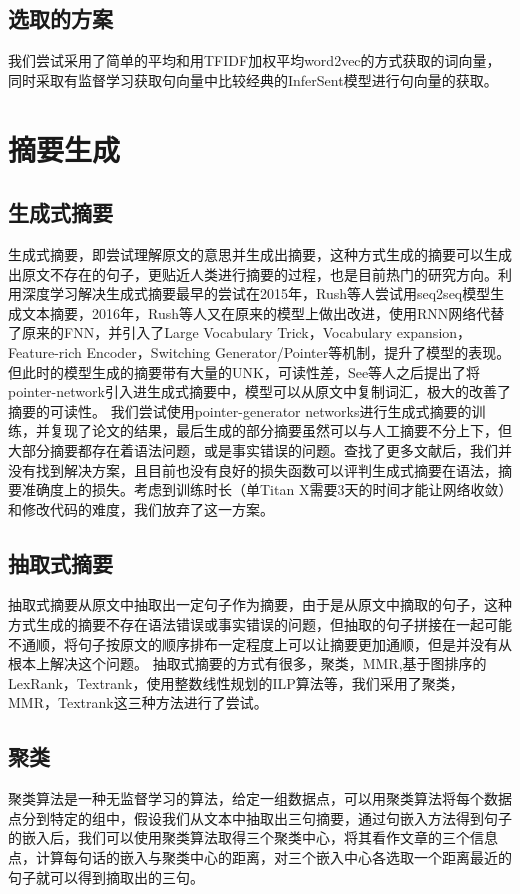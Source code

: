 \documentclass[10pt,twocolumn,letterpaper]{article}
\begin{document}
	\subsection{选取的方案}
	我们尝试采用了简单的平均和用TFIDF加权平均word2vec的方式获取的词向量，同时采取有监督学习获取句向量中比较经典的InferSent模型进行句向量的获取。


	\section{摘要生成}

	\subsection{生成式摘要}
	生成式摘要，即尝试理解原文的意思并生成出摘要，这种方式生成的摘要可以生成出原文不存在的句子，更贴近人类进行摘要的过程，也是目前热门的研究方向。利用深度学习解决生成式摘要最早的尝试在2015年，Rush等人\cite{rush2015neural}尝试用seq2seq模型生成文本摘要，2016年，Rush等人\cite{nallapati2016abstractive}又在原来的模型上做出改进，使用RNN网络代替了原来的FNN，并引入了Large Vocabulary Trick，Vocabulary expansion，Feature-rich Encoder，Switching Generator/Pointer等机制，提升了模型的表现。但此时的模型生成的摘要带有大量的UNK，可读性差，See等人\cite{see2017get}之后提出了将pointer-network\cite{vinyals2015pointer}引入进生成式摘要中，模型可以从原文中复制词汇，极大的改善了摘要的可读性。
	我们尝试使用pointer-generator networks\cite{see2017get}进行生成式摘要的训练，并复现了论文的结果，最后生成的部分摘要虽然可以与人工摘要不分上下，但大部分摘要都存在着语法问题，或是事实错误的问题。查找了更多文献后，我们并没有找到解决方案，且目前也没有良好的损失函数可以评判生成式摘要在语法，摘要准确度上的损失。考虑到训练时长（单Titan X需要3天的时间才能让网络收敛）和修改代码的难度，我们放弃了这一方案。

	\subsection{抽取式摘要}
	抽取式摘要从原文中抽取出一定句子作为摘要，由于是从原文中摘取的句子，这种方式生成的摘要不存在语法错误或事实错误的问题，但抽取的句子拼接在一起可能不通顺，将句子按原文的顺序排布一定程度上可以让摘要更加通顺，但是并没有从根本上解决这个问题。
	抽取式摘要的方式有很多，聚类，MMR,基于图排序的LexRank，Textrank，使用整数线性规划的ILP算法等，我们采用了聚类，MMR，Textrank这三种方法进行了尝试。
	
	\subsection{聚类}
	聚类算法是一种无监督学习的算法，给定一组数据点，可以用聚类算法将每个数据点分到特定的组中，假设我们从文本中抽取出三句摘要，通过句嵌入方法得到句子的嵌入后，我们可以使用聚类算法取得三个聚类中心，将其看作文章的三个信息点，计算每句话的嵌入与聚类中心的距离，对三个嵌入中心各选取一个距离最近的句子就可以得到摘取出的三句。
\end{document}
